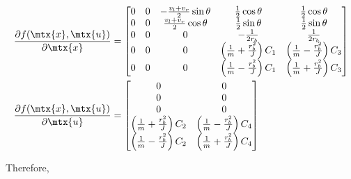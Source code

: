 \begin{align*}
  \frac{\partial f(\mtx{x}, \mtx{u})}{\partial\mtx{x}} &=
  \begin{bmatrix}
    0 & 0 & -\frac{v_l + v_r}{2}\sin\theta & \frac{1}{2}\cos\theta &
      \frac{1}{2}\cos\theta \\
    0 & 0 & \frac{v_l + v_r}{2}\cos\theta & \frac{1}{2}\sin\theta &
      \frac{1}{2}\sin\theta \\
    0 & 0 & 0 & -\frac{1}{2r_b} & \frac{1}{2r_b} \\
    0 & 0 & 0 & \left(\frac{1}{m} + \frac{r_b^2}{J}\right) C_1 &
      \left(\frac{1}{m} - \frac{r_b^2}{J}\right) C_3 \\
    0 & 0 & 0 & \left(\frac{1}{m} - \frac{r_b^2}{J}\right) C_1 &
      \left(\frac{1}{m} + \frac{r_b^2}{J}\right) C_3
  \end{bmatrix} \\
  \frac{\partial f(\mtx{x}, \mtx{u})}{\partial\mtx{u}} &=
  \begin{bmatrix}
    0 & 0 \\
    0 & 0 \\
    0 & 0 \\
    \left(\frac{1}{m} + \frac{r_b^2}{J}\right) C_2 &
    \left(\frac{1}{m} - \frac{r_b^2}{J}\right) C_4 \\
    \left(\frac{1}{m} - \frac{r_b^2}{J}\right) C_2 &
    \left(\frac{1}{m} + \frac{r_b^2}{J}\right) C_4
  \end{bmatrix}
\end{align*}

Therefore,


